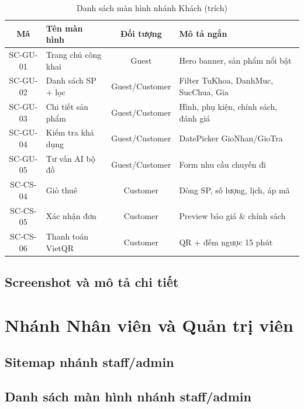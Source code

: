 \begin{table}[H]
\centering
\caption{Danh sách màn hình nhánh Khách (trích)}
\label{tab:screens_khach}
\begin{tabularx}{\textwidth}{|c|l|c|X|}
\hline
\textbf{Mã} & \textbf{Tên màn hình} & \textbf{Đối tượng} & \textbf{Mô tả ngắn} \\ \hline
SC-GU-01 & Trang chủ công khai         & Guest           & Hero banner, sản phẩm nổi bật \\ \hline
SC-GU-02 & Danh sách SP + lọc          & Guest/Customer  & Filter TuKhoa, DanhMuc, SucChua, Gia \\ \hline
SC-GU-03 & Chi tiết sản phẩm           & Guest/Customer  & Hình, phụ kiện, chính sách, đánh giá \\ \hline
SC-GU-04 & Kiểm tra khả dụng           & Guest/Customer  & DatePicker GioNhan/GioTra \\ \hline
SC-GU-05 & Tư vấn AI bộ đồ             & Guest/Customer  & Form nhu cầu chuyến đi \\ \hline
SC-CS-04 & Giỏ thuê                    & Customer        & Dòng SP, số lượng, lịch, áp mã \\ \hline
SC-CS-05 & Xác nhận đơn                & Customer        & Preview báo giá \& chính sách \\ \hline
SC-CS-06 & Thanh toán VietQR           & Customer        & QR + đếm ngược 15 phút \\ \hline
\end{tabularx}
\end{table}

\subsection{Screenshot và mô tả chi tiết}

\section{Nhánh Nhân viên và Quản trị viên}
\label{sec:ui_admin}

\subsection{Sitemap nhánh staff/admin}

\subsection{Danh sách màn hình nhánh staff/admin}

